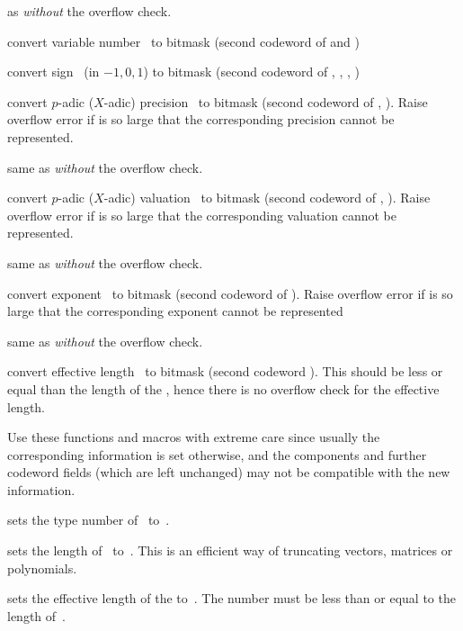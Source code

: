  as  \emph{without} the overflow
check.

 convert variable number~ to bitmask
(second codeword of  and )

 convert sign~ (in $-1,0,1$) to bitmask
(second codeword of , , , )

 convert $p$-adic ($X$-adic) precision~
to bitmask (second codeword of , ). Raise overflow error
if  is so large that the corresponding precision cannot be
represented.

 same as  \emph{without} the
overflow check.

 convert $p$-adic ($X$-adic) valuation~ to
bitmask (second codeword of , ). Raise overflow error if
 is so large that the corresponding valuation cannot be represented.

 same as  \emph{without} the
overflow check.

 convert exponent~ to bitmask (second
codeword of ). Raise overflow error if  is so
large that the corresponding exponent cannot be represented

 same as  \emph{without} the
overflow check.

 convert effective length~ to bitmask
(second codeword ). This should be less or equal than the length
of the , hence there is no overflow check for the effective length.

Use these functions and macros with extreme care since usually the
corresponding information is set otherwise, and the components and further
codeword fields (which are left unchanged) may not be compatible with the new
information.

 sets the type number of~ to~.

 sets the length of~ to~. This
is an efficient way of truncating vectors, matrices or polynomials.

 sets the effective length
of the   to~. The number  must be less than or
equal to the length of~.

